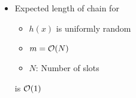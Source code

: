 \begin{itemize}
\begin{itemize}
\begin{itemize}
\begin{itemize}
\begin{itemize}
                                \end{itemize}
                            \item Expected length of chain for
                                \begin{itemize}
                                    \item $h(x)$ is uniformly random
                                    \item $m = \mathcal{O}(N)$
                                    \item $N$: Number of slots
                                \end{itemize}
                            is $\mathcal{O}(1)$
                        \end{itemize}
                \end{itemize}
        \end{itemize}
\end{itemize}

